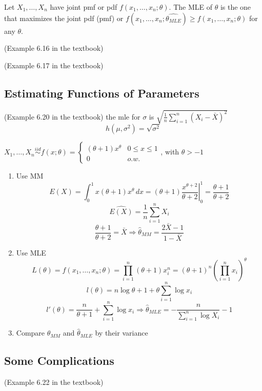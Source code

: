 \begin{defn}
Let $X_1,\dots,X_n$ have joint pmf or pdf $f(x_1,\dots,x_n;\theta)$. The MLE of $\theta$ is the one that maximizes the joint pdf (pmf) or $f(x_1,\dots,x_n;\hat{\theta_{MLE}})\geq f(x_1,\dots,x_n;\theta)$ for any $\theta$.
\end{defn}

\begin{exmp}
(Example 6.16 in the textbook)
\end{exmp}

\begin{exmp}
(Example 6.17 in the textbook)
\end{exmp}

\subsection{Estimating Functions of Parameters}
\noindent{}

\begin{exmp}
(Example 6.20 in the textbook)
the mle for $\sigma$ is $\sqrt{\frac{1}{n} \sum_{i=1}^n (X_i -\bar{X})^2 } $
\[h(\mu,\sigma^2)=\sqrt{\sigma^2}\]
\end{exmp}

\begin{exmp}
$X_1,\dots,X_n \overset{iid}{\sim} f(x;\theta)=\begin{cases}
(\theta+1)x^{\theta} & 0 \leq x \leq 1 \\
0 & o.w.
\end{cases}$, with $\theta>-1$
\begin{enumerate}
\item Use MM
\[E(X)=\int_0^1 x(\theta+1)x^{\theta} \,dx= (\theta+1)\left.\frac{x^{\theta+2}}{\theta+2}\right|_0^1 =\frac{\theta+1}{\theta+2}\]
\[\hat{E(X)}=\frac{1}{n}\sum_{i=1}^n X_i\]
\[\frac{\theta+1}{\theta+2}=\bar{X} \Rightarrow \hat{\theta}_{MM}=\frac{2\bar{X}-1}{1-\bar{X}}\]
\item Use MLE
\[L(\theta)=f(x_1,\dots,x_n;\theta)=\prod_{i=1}^n (\theta+1)x_i^n=(\theta+1)^n \left(\prod_{i=1}^n x_i\right)^{\theta}\]
\[l(\theta)=n\log{\theta+1}+\theta \sum_{i=1}^n \log{x_i}\]
\[l'(\theta)=\frac{n}{\theta+1}+\sum_{i=1}^n \log{x_i} \Rightarrow \hat{\theta}_{MLE}=-\frac{n}{\sum_{i=1}^n \log{X_i}}-1\]
\item Compare $\hat{\theta}_{MM}$ and $\hat{\theta}_{MLE}$ by their variance
\end{enumerate}
\end{exmp}

\subsection{Some Complications}
\begin{exmp}
(Example 6.22 in the textbook)
\end{exmp}